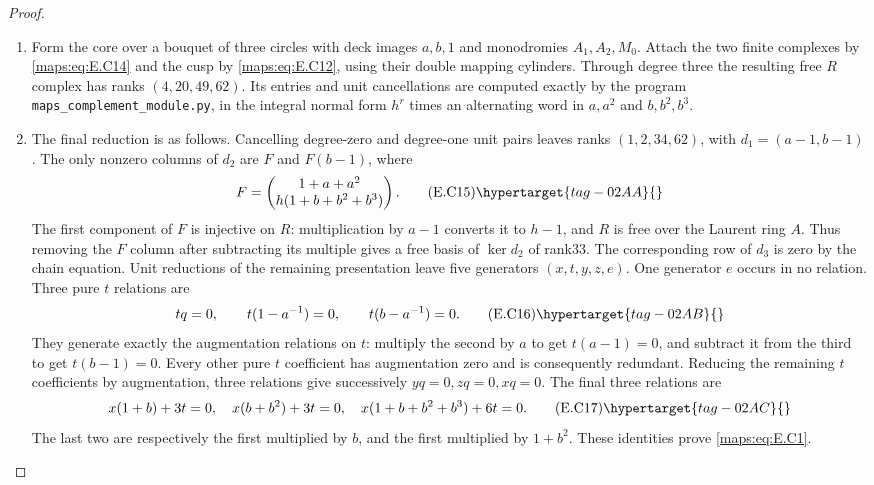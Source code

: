 \begin{proof}
\begin{enumerate}[label={$\langle1\rangle$\arabic*.},leftmargin=*]
\item Form the core over a bouquet of three circles with
deck images $a,b,1$ and monodromies $A_1,A_2,M_0$.
Attach the two finite complexes by \eqref{maps:eq:E.C14} and the
cusp by \eqref{maps:eq:E.C12}, using their double mapping cylinders.
Through degree three the resulting free $R$ complex
has ranks $(4,20,49,62)$. Its entries and unit cancellations are computed exactly by the program \texttt{maps\_complement\_module.py}, in the integral normal form $h^r$ times an alternating word in
$a,a^2$ and $b,b^2,b^3$.

\item The final reduction is as follows. Cancelling degree-zero
and degree-one unit pairs leaves ranks $(1,2,34,62)$,
with $d_1=(a-1,b-1)$. The only nonzero columns of
$d_2$ are $F$ and $F(b-1)$, where
\[
 F=\begin{pmatrix}1+a+a^2\\h(1+b+b^2+b^3)\end{pmatrix}.
 \tag{E.C15}\hypertarget{tag-02AA}{}\label{maps:eq:E.C15}
\]
The first component of $F$ is injective on $R$:
multiplication by $a-1$ converts it to $h-1$, and
$R$ is free over the Laurent ring $A$. Thus removing
the $F$ column after subtracting its multiple gives
a free basis of $\ker d_2$ of rank33. The corresponding
row of $d_3$ is zero by the chain equation. Unit
reductions of the remaining presentation leave five
generators $(x,t,y,z,e)$. One generator $e$ occurs
in no relation. Three pure $t$ relations are
\[
 tq=0,\qquad t(1-a^{-1})=0,
                  \qquad t(b-a^{-1})=0.
 \tag{E.C16}\hypertarget{tag-02AB}{}\label{maps:eq:E.C16}
\]
They generate exactly the augmentation relations on
$t$: multiply the second by $a$ to get $t(a-1)=0$,
and subtract it from the third to get $t(b-1)=0$.
Every other pure $t$ coefficient has augmentation
zero and is consequently redundant. Reducing the
remaining $t$ coefficients by augmentation, three
relations give successively $yq=0,zq=0,xq=0$.
The final three relations are
\[
 x(1+b)+3t=0,\quad x(b+b^2)+3t=0,
                   \quad x(1+b+b^2+b^3)+6t=0.
 \tag{E.C17}\hypertarget{tag-02AC}{}\label{maps:eq:E.C17}
\]
The last two are respectively the first multiplied
by $b$, and the first multiplied by $1+b^2$.
These identities prove \eqref{maps:eq:E.C1}.


\end{enumerate}
\end{proof}
